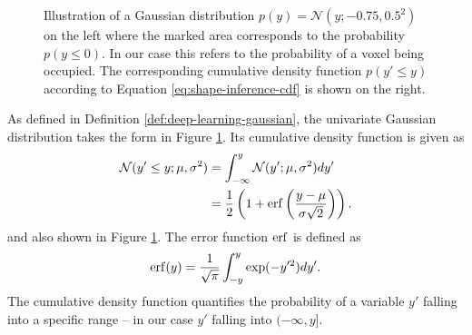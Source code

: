 \begin{figure}
\begin{subfigure}[t]{0.48\textwidth}
  \end{subfigure}
  \caption{Illustration of a Gaussian distribution $p(y) = \mathcal{N}(y;-0.75,0.5^2)$
  on the left where the marked area corresponds to the probability $p(y \leq 0)$.
  In our case this refers to the probability of a voxel being occupied. The
  corresponding cumulative density function $p(y' \leq y)$ according to Equation
  \eqref{eq:shape-inference-cdf} is shown on the right.
  }
  \label{fig:shape-inference-gaussian}
\end{figure}

\begin{example}
  As defined in Definition \ref{def:deep-learning-gaussian}, the univariate
  Gaussian distribution takes the form in Figure
  \ref{fig:shape-inference-gaussian}. Its cumulative density
  function is given as
  \begin{align}
    \mathcal{N}(y' \leq y; \mu, \sigma^2) &= \int_{-\infty}^y \mathcal{N}(y'; \mu, \sigma^2) dy'\\
    &= \frac{1}{2}\left(1 + \mathrm{erf}\left(\frac{y - \mu}{\sigma \sqrt{2}}\right)\right).
    \label{eq:shape-inference-cdf}
  \end{align}
  and also shown in Figure \ref{fig:shape-inference-gaussian}.
  The error function $\mathrm{erf}$ is defined as
  \begin{align}
    \mathrm{erf}(y) = \frac{1}{\sqrt{\pi}} \int_{-y}^y \exp(-y'^2) dy'.
  \end{align}
  The cumulative density function quantifies the probability of a variable
  $y'$ falling into a specific range -- in our case $y'$ falling into $(-\infty,y]$.
\end{example}

